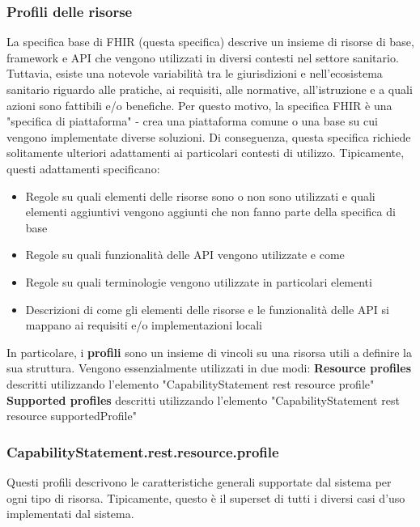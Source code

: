 \documentclass{article}
\begin{document}
\subsubsection{Profili delle risorse}
La specifica base di FHIR (questa specifica) descrive un insieme di risorse di base, framework e API che vengono utilizzati in diversi contesti nel settore sanitario. Tuttavia, esiste una notevole variabilità tra le giurisdizioni e nell'ecosistema sanitario riguardo alle pratiche, ai requisiti, alle normative, all'istruzione e a quali azioni sono fattibili e/o benefiche.
Per questo motivo, la specifica FHIR è una "specifica di piattaforma" - crea una piattaforma comune o una base su cui vengono implementate diverse soluzioni. Di conseguenza, questa specifica richiede solitamente ulteriori adattamenti ai particolari contesti di utilizzo. Tipicamente, questi adattamenti specificano:
\begin{itemize}
    \item Regole su quali elementi delle risorse sono o non sono utilizzati e quali elementi aggiuntivi vengono aggiunti che non fanno parte della specifica di base
    \item Regole su quali funzionalità delle API vengono utilizzate e come
    \item Regole su quali terminologie vengono utilizzate in particolari elementi
    \item Descrizioni di come gli elementi delle risorse e le funzionalità delle API si mappano ai requisiti e/o implementazioni locali
\end{itemize}
In particolare, i \textbf{profili} sono un insieme di vincoli su una risorsa utili a definire la sua struttura.
Vengono essenzialmente utilizzati in due modi:
\textbf{Resource profiles} descritti utilizzando l'elemento "CapabilityStatement rest resource profile"
\textbf{Supported profiles} descritti utilizzando l'elemento "CapabilityStatement rest resource supportedProfile"

\subsubsection*{CapabilityStatement.rest.resource.profile}
Questi profili descrivono le caratteristiche generali supportate dal sistema per ogni tipo di risorsa.
Tipicamente, questo è il superset di tutti i diversi casi d'uso implementati dal sistema.
\end{document}
